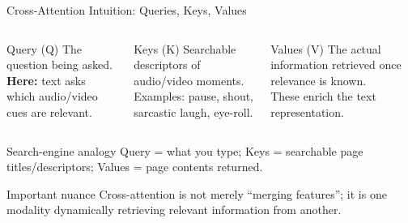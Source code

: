 \documentclass[aspectratio=169,10pt]{beamer}
\begin{document}
\begin{frame}[t]{Cross-Attention Intuition: Queries, Keys, Values}
\begin{columns}[T,onlytextwidth]
\begin{block}{Query (Q)}
The question being asked.\\[0.25em]
\textbf{Here:} text asks which audio/video cues are relevant.
\end{block}
\begin{block}{Keys (K)}
Searchable descriptors of audio/video moments.\\[0.25em]
Examples: pause, shout, sarcastic laugh, eye-roll.
\end{block}
\begin{block}{Values (V)}
The actual information retrieved once relevance is known.\\[0.25em]
These enrich the text representation.
\end{block}
\end{columns}
\vspace{0.35cm}
\begin{exampleblock}{Search-engine analogy}
Query = what you type; Keys = searchable page titles/descriptors; Values = page contents returned.
\end{exampleblock}
\begin{alertblock}{Important nuance}
Cross-attention is not merely ``merging features''; it is one modality dynamically retrieving relevant information from another.
\end{alertblock}
\end{frame}
\end{document}
